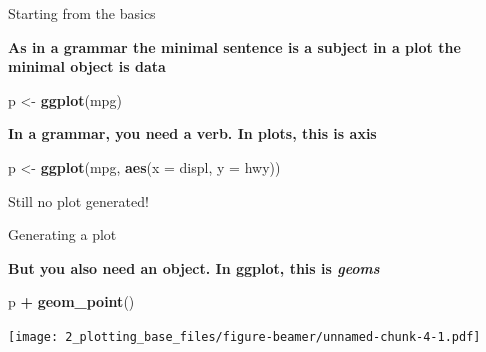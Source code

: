 \documentclass[
  ignorenonframetext,
]{beamer}
\newenvironment{Shaded}{\begin{snugshade}}{\end{snugshade}}
\newcommand{\DataTypeTok}[1]{\textcolor[rgb]{0.13,0.29,0.53}{#1}}
\newcommand{\KeywordTok}[1]{\textcolor[rgb]{0.13,0.29,0.53}{\textbf{#1}}}
\newcommand{\NormalTok}[1]{#1}
\newcommand{\OperatorTok}[1]{\textcolor[rgb]{0.81,0.36,0.00}{\textbf{#1}}}
\newcommand{\StringTok}[1]{\textcolor[rgb]{0.31,0.60,0.02}{#1}}
\begin{document}
\begin{frame}[fragile]{Starting from the basics}
\protect\hypertarget{starting-from-the-basics}{}

\textbf{As in a grammar the minimal sentence is a subject in a plot the
minimal object is data }

\begin{Shaded}
\begin{Highlighting}[]
\NormalTok{p <-}\StringTok{ }\KeywordTok{ggplot}\NormalTok{(mpg)}
\end{Highlighting}
\end{Shaded}

\textbf{In a grammar, you need a verb. In plots, this is axis}

\begin{Shaded}
\begin{Highlighting}[]
\NormalTok{p <-}\StringTok{ }\KeywordTok{ggplot}\NormalTok{(mpg, }\KeywordTok{aes}\NormalTok{(}\DataTypeTok{x =}\NormalTok{ displ, }\DataTypeTok{y =}\NormalTok{ hwy))}
\end{Highlighting}
\end{Shaded}

\begin{block}{Still no plot generated!}

\end{block}

\end{frame}

\begin{frame}[fragile]{Generating a plot}
\protect\hypertarget{generating-a-plot}{}

\textbf{But you also need an object. In ggplot, this is \emph{geoms} }

\begin{Shaded}
\begin{Highlighting}[]
\NormalTok{p }\OperatorTok{+}\StringTok{ }\KeywordTok{geom_point}\NormalTok{()}
\end{Highlighting}
\end{Shaded}

\texttt{[image: 2\_plotting\_base\_files/figure-beamer/unnamed-chunk-4-1.pdf]}

\end{frame}
\end{document}
